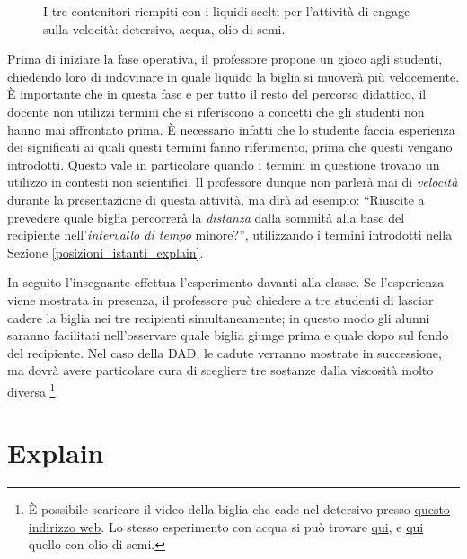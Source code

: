 \documentclass{report} \usepackage[T1]{fontenc} \usepackage[italian]{babel}
\begin{document}
\begin{figure}[H]
\begin{subfigure}[b]{0.5\textwidth}
  \end{subfigure}
  \caption{
           I tre contenitori riempiti con i liquidi
           scelti per l'attività di engage sulla
           velocità: detersivo, acqua, olio di semi.
          }
  \label{fig:liquids}
\end{figure}

Prima di iniziare la fase operativa, il professore propone un gioco
agli studenti, chiedendo loro di indovinare in quale liquido la biglia
si muoverà più velocemente. \`E importante che in questa fase e per
tutto il resto del percorso didattico, il docente non utilizzi termini
che si riferiscono a concetti che gli studenti non hanno mai
affrontato prima. \`E necessario infatti che lo studente faccia
esperienza dei significati ai quali questi termini fanno riferimento,
prima che questi vengano introdotti. Questo vale in particolare
quando i termini in questione trovano un utilizzo in contesti
non scientifici\cite{arons1997teaching}.
Il professore dunque non parlerà mai di \emph{velocità} durante
la presentazione di questa attività, ma dirà ad esempio:
``Riuscite a prevedere quale biglia percorrerà la \emph{distanza}
dalla sommità alla base del recipiente nell'\emph{intervallo di tempo}
minore?'', utilizzando i termini introdotti nella Sezione
\ref{posizioni_istanti_explain}.

In seguito l'insegnante effettua l'esperimento davanti alla classe.
Se l'esperienza viene mostrata in presenza, il professore
può chiedere a tre studenti di lasciar cadere la biglia nei tre recipienti
simultaneamente; in questo modo gli alunni saranno facilitati
nell'osservare quale biglia giunge prima e quale dopo sul fondo del
recipiente. Nel caso della DAD, le cadute verranno mostrate in successione,
 ma dovrà avere particolare cura di scegliere tre sostanze dalla
viscosità molto diversa
\footnote{
          \`E possibile scaricare il video della biglia che
          cade nel detersivo presso
          \href{https://github.com/savaroskij/PED1/blob/master/progetto_finale/media/video/biglia_detersivo.mp4?raw=true}{questo indirizzo web}.
          Lo stesso esperimento con acqua si può trovare
          \href{http://burymewithmymoney.com/}{qui},
          e
          \href{http://burymewithmymoney.com/}{qui}
          quello con olio di semi.
         }.

\section{Explain}\label{velocità_explain}
\end{document}
